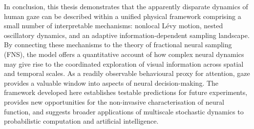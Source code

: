 In conclusion, this thesis demonstrates that the apparently disparate dynamics of human gaze can be described within a unified physical framework comprising a small number of interpretable mechanisms: nonlocal Lévy motion, nested oscillatory dynamics, and an adaptive information-dependent sampling landscape. By connecting these mechanisms to the theory of fractional neural sampling (FNS), the model offers a quantitative account of how complex neural dynamics may give rise to the coordinated exploration of visual information across spatial and temporal scales. As a readily observable behavioural proxy for attention, gaze provides a valuable window into aspects of neural decision-making. The framework developed here establishes testable predictions for future experiments, provides new opportunities for the non-invasive characterisation of neural function, and suggests broader applications of multiscale stochastic dynamics to probabilistic computation and artificial intelligence.